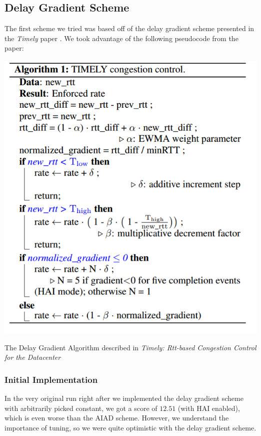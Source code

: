 \documentclass[11pt,a4paper]{article}
\begin{document}
\subsection{Delay Gradient Scheme}
The first scheme we tried was based off of the delay gradient scheme presented
in the \textit{Timely} paper \cite{mittal2015timely}.  We took advantage of the
following pseudocode from the paper:

\begin{algorithm}
  \includegraphics[scale=0.54]{Timely_pseudocode}
  \caption{The Delay Gradient Algorithm described in \textit{Timely: Rtt-based
  Congestion Control for the Datacenter} \cite{mittal2015timely}}
  \label{alg}
\end{algorithm}

\subsubsection{Initial Implementation}


In the very original run right after we implemented the delay gradient scheme
with arbitrarily picked constant, we got a score of $12.51$ (with HAI enabled), which is even worse
than the AIAD scheme. However, we understand the importance of tuning, so we
were quite optimistic with the delay gradient scheme.
\end{document}
